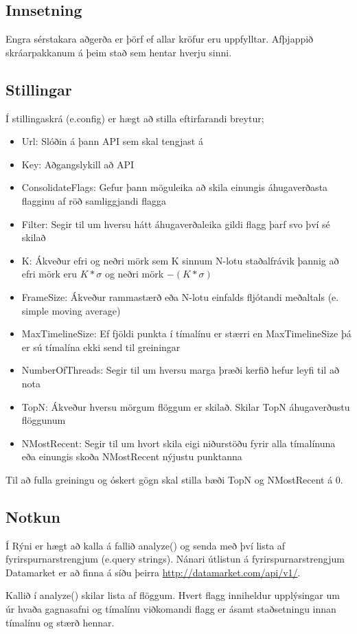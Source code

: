 \documentclass[11pt]{article}
\begin{document}
\subsection{Innsetning}
Engra sérstakara aðgerða er þörf ef allar kröfur eru uppfylltar. Afþjappið skráarpakkanum á þeim stað sem hentar hverju sinni.
\subsection{Stillingar}
Í stillingaskrá (e.config) er hægt að stilla eftirfarandi breytur;\\


\begin{itemize}
  \item Url: Slóðin á þann API sem skal tengjast á
  \item Key: Aðgangslykill að API

  \item ConsolidateFlags: Gefur þann möguleika að skila einungis áhugaverðasta flagginu af röð samliggjandi flagga
  \item Filter: Segir til um hversu hátt áhugaverðaleika gildi flagg þarf svo því sé skilað

  \item K: Ákveður efri og neðri mörk sem K sinnum N-lotu staðalfrávik þannig að efri mörk eru $ K*\sigma$ og neðri mörk $-(K*\sigma)$
  \item FrameSize: Ákveður rammastærð eða N-lotu einfalds fljótandi meðaltals (e. simple moving average)
  \item MaxTimelineSize: Ef fjöldi punkta í tímalínu er stærri en MaxTimelineSize þá er sú tímalína ekki send til greiningar
  \item NumberOfThreads: Segir til um hversu marga þræði kerfið hefur leyfi til að nota

  \item TopN: Ákveður hversu mörgum flöggum er skilað. Skilar TopN áhugaverðustu flöggunum
  \item NMostRecent: Segir til um hvort skila eigi niðurstöðu fyrir alla tímalínuna eða einungis skoða NMostRecent nýjustu punktanna
\end{itemize}

Til að fulla greiningu og óskert gögn skal stilla bæði TopN og NMostRecent á 0.


\subsection{Notkun}
Í Rýni er hægt að kalla á fallið analyze() og senda með því lista af fyrirspurnarstrengjum (e.query strings).
Nánari útlistun á fyrirspurnarstrengjum Datamarket er að finna á síðu þeirra \url{http://datamarket.com/api/v1/}.

Kallið í analyze() skilar lista af flöggum. Hvert flagg inniheldur upplýsingar um úr hvaða gagnasafni og 
tímalínu viðkomandi flagg er ásamt staðsetningu innan tímalínu og stærð hennar.
\end{document}
